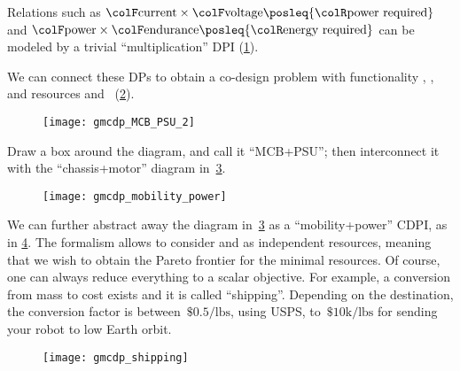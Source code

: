 \begin{example}

	Relations such as ${\colF\mbox{current}}\times{\colF\mbox{voltage}}\posleq{\colR\mbox{power required}}$
	and ${\colF\mbox{power}}\times{\colF\mbox{endurance}}\posleq{\colR\mbox{energy required}}$
	can be modeled by a trivial ``multiplication'' DPI (\cref{fig:current_times_voltage}).

	\begin{figure}[h!]
		\centering
		\caption{}
		\label{fig:current_times_voltage}
	\end{figure}


	We can connect these DPs to obtain a co-design problem with functionality , ,  and resources  and ~(\cref{fig:connect}).

	\begin{figure}[h!]
		\centering
		\texttt{[image: gmcdp\_MCB\_PSU\_2]}
		\caption{}
		\label{fig:connect}
	\end{figure}


	Draw a box around the diagram, and call it ``MCB+PSU'';
	then interconnect it with the ``chassis+motor'' diagram in~\cref{fig:another}.

	\begin{figure}[h!]
		\centering
		\texttt{[image: gmcdp\_mobility\_power]}
		\caption{}
		\label{fig:another}
	\end{figure}

	We can further abstract away the diagram in~\cref{fig:another} as a ``mobility+power'' CDPI, as in \cref{fig:shipping}.
	The formalism allows to consider  and  as independent resources, meaning that we wish to obtain the Pareto frontier for the minimal resources.
	Of course, one can always reduce everything to a scalar objective.
	For example, a conversion from mass to cost exists and it is called ``shipping''.
	Depending on the destination, the conversion factor is between~$\$0.5/\mbox{lbs}$, using USPS, to~$\$10\mbox{k}/\mbox{lbs}$ for sending your robot to low Earth orbit.

	\begin{figure}[h!]
		\centering{}
		\texttt{[image: gmcdp\_shipping]}
		\caption{}
		\label{fig:shipping}
	\end{figure}

\end{example}

